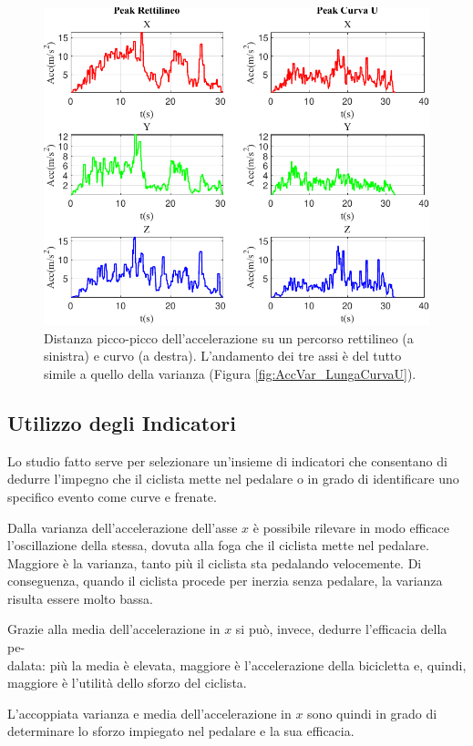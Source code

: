 \documentclass[class=article]{standalone}
\begin{document}
	\begin{center}
		\begin{figure}[h!]
			\centering\includegraphics[width=.7\textwidth]{img/LungaCurvaU/Acc/Peak}
			\caption[]{Distanza picco-picco dell'accelerazione su un percorso rettilineo (a sinistra) e curvo (a destra). L'andamento dei tre assi è del tutto simile a quello della varianza (Figura \ref{fig:AccVar_LungaCurvaU}).}
			\label{fig:AccPeak_LungaCurvaU}
		\end{figure}
	\end{center}
	
	\subsection{Utilizzo degli Indicatori}
	Lo studio fatto serve per selezionare un'insieme di indicatori che consentano di dedurre l'impegno che il ciclista mette nel pedalare o in grado di identificare uno specifico evento come curve e frenate.
	
	Dalla varianza dell'accelerazione dell'asse \(x\) è possibile rilevare in modo efficace l'oscillazione della stessa, dovuta alla foga che il ciclista mette nel pedalare. Maggiore è la varianza, tanto più il ciclista sta pedalando velocemente. Di conseguenza, quando il ciclista procede per inerzia senza pedalare, la varianza risulta essere molto bassa.
	
	Grazie alla media dell'accelerazione in \(x\) si può, invece, dedurre l'efficacia della pe-\\dalata: più la media è elevata, maggiore è l'accelerazione della bicicletta e, quindi, maggiore è l'utilità dello sforzo del ciclista.
	
	L'accoppiata varianza e media dell'accelerazione in \(x\) sono quindi in grado di determinare lo sforzo impiegato nel pedalare e la sua efficacia.
	
\end{document}
